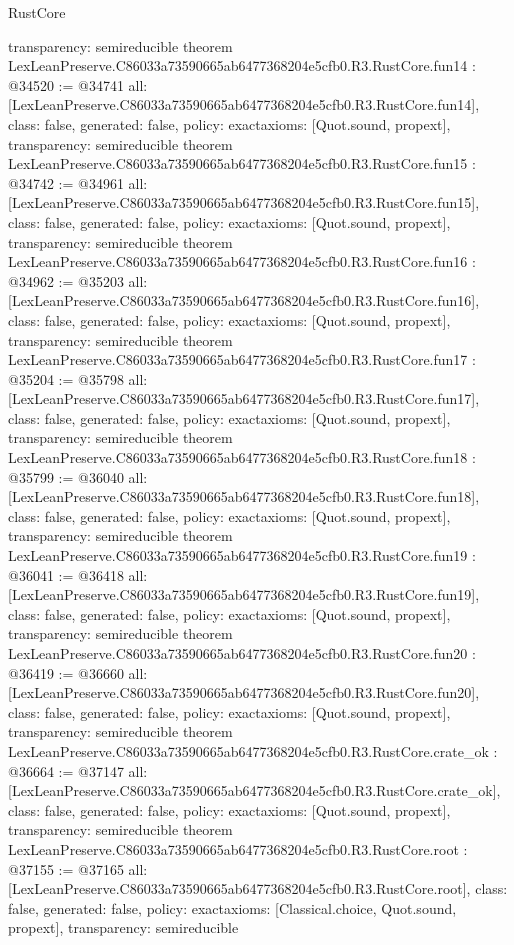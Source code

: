 \begin{lexlean}{RustCore}
\begin{coremodule}
{  transparency: semireducible
}
theorem LexLeanPreserve.C86033a73590665ab6477368204e5cfb0.R3.RustCore.fun14 : @34520 := @34741 {
  all: [LexLeanPreserve.C86033a73590665ab6477368204e5cfb0.R3.RustCore.fun14],
  class: false,
  generated: false,
  policy: exact{axioms: [Quot.sound, propext]},
  transparency: semireducible
}
theorem LexLeanPreserve.C86033a73590665ab6477368204e5cfb0.R3.RustCore.fun15 : @34742 := @34961 {
  all: [LexLeanPreserve.C86033a73590665ab6477368204e5cfb0.R3.RustCore.fun15],
  class: false,
  generated: false,
  policy: exact{axioms: [Quot.sound, propext]},
  transparency: semireducible
}
theorem LexLeanPreserve.C86033a73590665ab6477368204e5cfb0.R3.RustCore.fun16 : @34962 := @35203 {
  all: [LexLeanPreserve.C86033a73590665ab6477368204e5cfb0.R3.RustCore.fun16],
  class: false,
  generated: false,
  policy: exact{axioms: [Quot.sound, propext]},
  transparency: semireducible
}
theorem LexLeanPreserve.C86033a73590665ab6477368204e5cfb0.R3.RustCore.fun17 : @35204 := @35798 {
  all: [LexLeanPreserve.C86033a73590665ab6477368204e5cfb0.R3.RustCore.fun17],
  class: false,
  generated: false,
  policy: exact{axioms: [Quot.sound, propext]},
  transparency: semireducible
}
theorem LexLeanPreserve.C86033a73590665ab6477368204e5cfb0.R3.RustCore.fun18 : @35799 := @36040 {
  all: [LexLeanPreserve.C86033a73590665ab6477368204e5cfb0.R3.RustCore.fun18],
  class: false,
  generated: false,
  policy: exact{axioms: [Quot.sound, propext]},
  transparency: semireducible
}
theorem LexLeanPreserve.C86033a73590665ab6477368204e5cfb0.R3.RustCore.fun19 : @36041 := @36418 {
  all: [LexLeanPreserve.C86033a73590665ab6477368204e5cfb0.R3.RustCore.fun19],
  class: false,
  generated: false,
  policy: exact{axioms: [Quot.sound, propext]},
  transparency: semireducible
}
theorem LexLeanPreserve.C86033a73590665ab6477368204e5cfb0.R3.RustCore.fun20 : @36419 := @36660 {
  all: [LexLeanPreserve.C86033a73590665ab6477368204e5cfb0.R3.RustCore.fun20],
  class: false,
  generated: false,
  policy: exact{axioms: [Quot.sound, propext]},
  transparency: semireducible
}
theorem LexLeanPreserve.C86033a73590665ab6477368204e5cfb0.R3.RustCore.crate_ok : @36664 := @37147 {
  all: [LexLeanPreserve.C86033a73590665ab6477368204e5cfb0.R3.RustCore.crate_ok],
  class: false,
  generated: false,
  policy: exact{axioms: [Quot.sound, propext]},
  transparency: semireducible
}
theorem LexLeanPreserve.C86033a73590665ab6477368204e5cfb0.R3.RustCore.root : @37155 := @37165 {
  all: [LexLeanPreserve.C86033a73590665ab6477368204e5cfb0.R3.RustCore.root],
  class: false,
  generated: false,
  policy: exact{axioms: [Classical.choice, Quot.sound, propext]},
  transparency: semireducible
}


\end{coremodule}
\end{lexlean}
